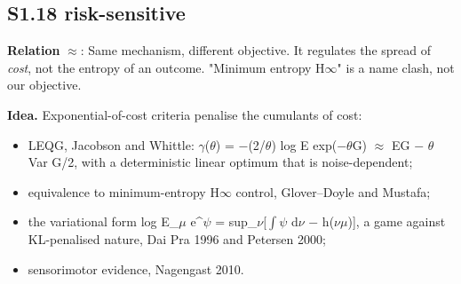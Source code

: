 \documentclass[10pt]{article}
\begin{document}
\subsection{S1.18 risk-sensitive}\label{node:S1-S1-18-risk-sensitive}
\textbf{Relation} $\approx$: Same mechanism, different objective. It regulates the spread of \emph{cost}, not the entropy of an outcome. "Minimum entropy H\ensuremath{\infty}" is a name clash, not our objective.

\textbf{Idea.} Exponential-of-cost criteria penalise the cumulants of cost:
\begin{itemize}[nosep,leftmargin=1.2em]
\item LEQG, Jacobson and Whittle: \ensuremath{\gamma}(\ensuremath{\theta}) = \ensuremath{-}(2/\ensuremath{\theta}) log E exp(\ensuremath{-}\ensuremath{\theta}G) \ensuremath{\approx} EG \ensuremath{-} \ensuremath{\theta} Var G/2, with a deterministic linear optimum that is noise-dependent;
\item equivalence to minimum-entropy H\ensuremath{\infty} control, Glover--Doyle and Mustafa;
\item the variational form log E\_\ensuremath{\mu} e\^{}\ensuremath{\psi} = sup\_\ensuremath{\nu}[\ensuremath{\int}\ensuremath{\psi} d\ensuremath{\nu} \ensuremath{-} h(\ensuremath{\nu}\textbar{}\ensuremath{\mu})], a game against KL-penalised nature, Dai Pra 1996 and Petersen 2000;
\item sensorimotor evidence, Nagengast 2010.
\end{itemize}
\end{document}
